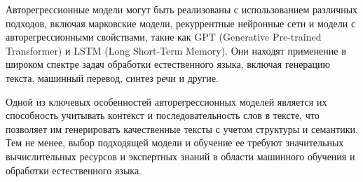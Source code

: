 Авторегрессионные модели могут быть реализованы с использованием различных подходов, включая марковские модели, рекуррентные нейронные сети и модели с авторегрессионными свойствами, такие как GPT (Generative Pre-trained Transformer) и LSTM (Long Short-Term Memory). Они находят применение в широком спектре задач обработки естественного языка, включая генерацию текста, машинный перевод, синтез речи и другие.

Одной из ключевых особенностей авторегрессионных моделей является их способность учитывать контекст и последовательность слов в тексте, что позволяет им генерировать качественные тексты с учетом структуры и семантики. Тем не менее, выбор подходящей модели и обучение ее требуют значительных вычислительных ресурсов и экспертных знаний в области машинного обучения и обработки естественного языка.
